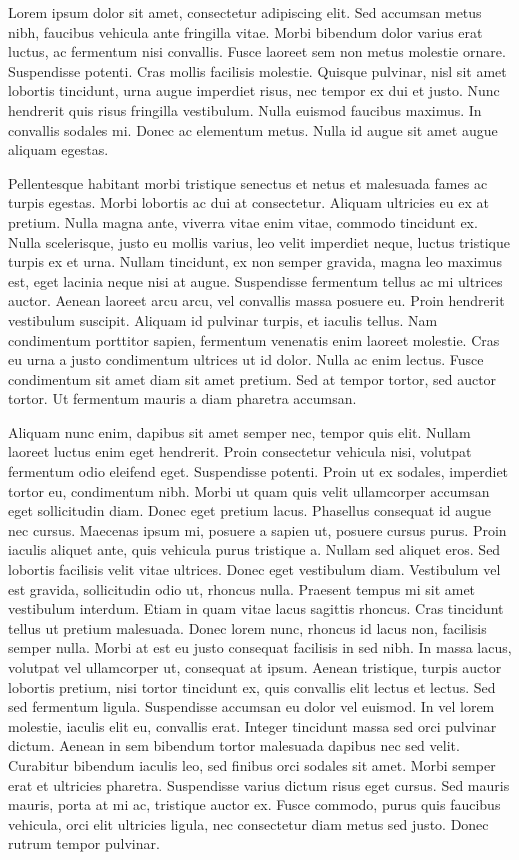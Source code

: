 Lorem ipsum dolor sit amet, consectetur adipiscing elit. Sed accumsan metus
nibh, faucibus vehicula ante fringilla vitae. Morbi bibendum dolor varius erat
luctus, ac fermentum nisi convallis. Fusce laoreet sem non metus molestie
ornare. Suspendisse potenti. Cras mollis facilisis molestie. Quisque pulvinar,
nisl sit amet lobortis tincidunt, urna augue imperdiet risus, nec tempor ex dui
et justo. Nunc hendrerit quis risus fringilla vestibulum. Nulla euismod
faucibus maximus. In convallis sodales mi. Donec ac elementum metus. Nulla id
augue sit amet augue aliquam egestas.

Pellentesque habitant morbi tristique senectus et netus et malesuada fames ac
turpis egestas. Morbi lobortis ac dui at consectetur. Aliquam ultricies eu ex
at pretium. Nulla magna ante, viverra vitae enim vitae, commodo tincidunt ex.
Nulla scelerisque, justo eu mollis varius, leo velit imperdiet neque, luctus
tristique turpis ex et urna. Nullam tincidunt, ex non semper gravida, magna leo
maximus est, eget lacinia neque nisi at augue. Suspendisse fermentum tellus ac
mi ultrices auctor. Aenean laoreet arcu arcu, vel convallis massa posuere eu.
Proin hendrerit vestibulum suscipit. Aliquam id pulvinar turpis, et iaculis
tellus. Nam condimentum porttitor sapien, fermentum venenatis enim laoreet
molestie. Cras eu urna a justo condimentum ultrices ut id dolor. Nulla ac enim
lectus. Fusce condimentum sit amet diam sit amet pretium. Sed at tempor tortor,
sed auctor tortor. Ut fermentum mauris a diam pharetra accumsan.

Aliquam nunc enim, dapibus sit amet semper nec, tempor quis elit. Nullam
laoreet luctus enim eget hendrerit. Proin consectetur vehicula nisi, volutpat
fermentum odio eleifend eget. Suspendisse potenti. Proin ut ex sodales,
imperdiet tortor eu, condimentum nibh. Morbi ut quam quis velit ullamcorper
accumsan eget sollicitudin diam. Donec eget pretium lacus. Phasellus consequat
id augue nec cursus. Maecenas ipsum mi, posuere a sapien ut, posuere cursus
purus. Proin iaculis aliquet ante, quis vehicula purus tristique a. Nullam sed
aliquet eros. Sed lobortis facilisis velit vitae ultrices. Donec eget
vestibulum diam. Vestibulum vel est gravida, sollicitudin odio ut, rhoncus
nulla. Praesent tempus mi sit amet vestibulum interdum. Etiam in quam vitae lacus
sagittis rhoncus. Cras tincidunt tellus ut pretium malesuada. Donec lorem nunc,
rhoncus id lacus non, facilisis semper nulla. Morbi at est eu justo consequat
facilisis in sed nibh. In massa lacus, volutpat vel ullamcorper ut, consequat
at ipsum. Aenean tristique, turpis auctor lobortis pretium, nisi tortor
tincidunt ex, quis convallis elit lectus et lectus.
Sed sed fermentum ligula. Suspendisse accumsan eu dolor vel euismod. In vel
lorem molestie, iaculis elit eu, convallis erat. Integer tincidunt massa sed
orci pulvinar dictum. Aenean in sem bibendum tortor malesuada dapibus nec sed
velit. Curabitur bibendum iaculis leo, sed finibus orci sodales sit amet. Morbi
semper erat et ultricies pharetra. Suspendisse varius dictum risus eget cursus.
Sed mauris mauris, porta at mi ac, tristique auctor ex. Fusce commodo, purus
quis faucibus vehicula, orci elit ultricies ligula, nec consectetur diam metus
sed justo. Donec rutrum tempor pulvinar.


